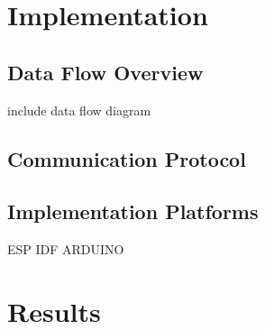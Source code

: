 \section{Implementation}
\subsection{Data Flow Overview}
include data flow diagram

\subsection{Communication Protocol}
\subsection{Implementation Platforms}

ESP IDF
ARDUINO



\section{Results}








